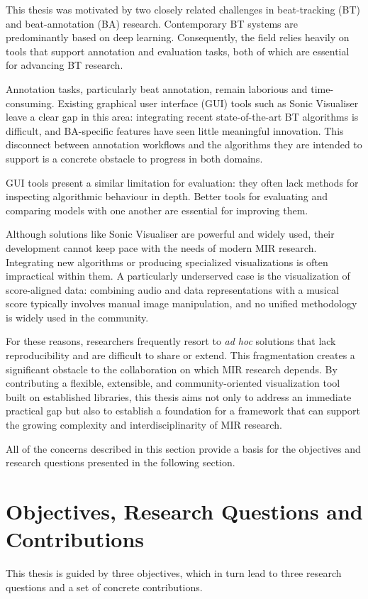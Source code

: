 This thesis was motivated by two closely related challenges in beat-tracking (BT) and beat-annotation (BA) research. Contemporary BT systems are predominantly based on deep learning. Consequently, the field relies heavily on tools that support annotation and evaluation tasks, both of which are essential for advancing BT research.

Annotation tasks, particularly beat annotation, remain laborious and time-consuming. Existing graphical user interface (GUI) tools such as Sonic Visualiser leave a clear gap in this area: integrating recent state-of-the-art BT algorithms is difficult, and BA-specific features have seen little meaningful innovation. This disconnect between annotation workflows and the algorithms they are intended to support is a concrete obstacle to progress in both domains.

GUI tools present a similar limitation for evaluation: they often lack methods for inspecting algorithmic behaviour in depth. Better tools for evaluating and comparing models with one another are essential for improving them.

Although solutions like Sonic Visualiser \cite{cannam2010SonicVisualiserOpen} are powerful and widely used, their development cannot keep pace with the needs of modern MIR research. Integrating new algorithms or producing specialized visualizations is often impractical within them. A particularly underserved case is the visualization of score-aligned data: combining audio and data representations with a musical score typically involves manual image manipulation, and no unified methodology is widely used in the community.

For these reasons, researchers frequently resort to \textit{ad hoc} solutions that lack reproducibility and are difficult to share or extend. This fragmentation creates a significant obstacle to the collaboration on which MIR research depends. By contributing a flexible, extensible, and community-oriented visualization tool built on established libraries, this thesis aims not only to address an immediate practical gap but also to establish a foundation for a framework that can support the growing complexity and interdisciplinarity of MIR research.

All of the concerns described in this section provide a basis for the objectives and research questions presented in the following section.
\pagebreak
\section{Objectives, Research Questions and Contributions}
This thesis is guided by three objectives, which in turn lead to three research questions and a set of concrete contributions.

